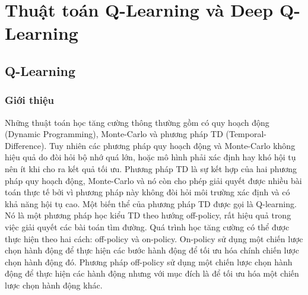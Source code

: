 \chapter{Thuật toán Q-Learning và Deep Q-Learning}
\label{ch:04}
\section{Q-Learning}
\subsection{Giới thiệu}
Những thuật toán học tăng cường thông thường gồm có quy hoạch động (Dynamic
Programming), Monte-Carlo và phương pháp TD (Temporal-Difference). Tuy nhiên các phương
pháp quy hoạch động và Monte-Carlo không hiệu quả do đòi hỏi bộ nhớ quá lớn, hoặc mô hình
phải xác định hay khó hội tụ nên ít khi cho ra kết quả tối ưu. Phương pháp TD là sự kết hợp của
hai phương pháp quy hoạch động, Monte-Carlo và nó còn cho phép giải quyết được nhiều bài toán thực tế bởi vì phương
pháp này không đòi hỏi môi trường xác định và có khả năng hội tụ cao. Một biến thể của
phương pháp TD được gọi là Q-learning. Nó là một phương pháp học kiểu TD theo hướng off-policy,
rất hiệu quả trong việc giải quyết các bài toán tìm đường. Quá trình học tăng cường có thể được thực
hiện theo hai cách: off-policy và on-policy. On-policy sử dụng một chiến lược chọn hành động để thực
hiện các bước hành động để tối ưu hóa chính chiến lược chọn hành động đó. Phương pháp off-policy
sử dụng một chiến lược chọn hành động để thực hiện các hành động nhưng với mục đích là để tối ưu
hóa một chiến lược chọn hành động khác.
